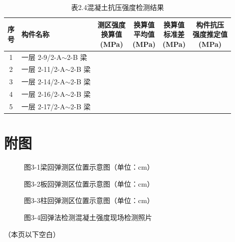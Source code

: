 \documentclass[UTF8, zihao=-4, a4paper]{ctexart}
\begin{document}
\begin{table}[h]\centering
\caption*{\songti 表2.4\quad 混凝土抗压强度检测结果}
\renewcommand{\arraystretch}{1.4}
\begin{tabular}{|c|l|c|c|c|c|}
\hline
\makecell{序\\号} & 构件名称 & \makecell{测区强度\\换算值\\(MPa)} & \makecell{换算值\\平均值\\(MPa)} & \makecell{换算值\\标准差\\(MPa)} & \makecell{构件抗压\\强度推定值\\(MPa)} \\\hline
1 & 一层 2-9/2-A$\sim$2-B 梁  & ~ & ~ & ~ & ~ \\\hline
2 & 一层 2-11/2-A$\sim$2-B 梁 & ~ & ~ & ~ & ~ \\\hline
3 & 一层 2-14/2-A$\sim$2-B 梁 & ~ & ~ & ~ & ~ \\\hline
4 & 一层 2-16/2-A$\sim$2-B 梁 & ~ & ~ & ~ & ~ \\\hline
5 & 一层 2-17/2-A$\sim$2-B 梁 & ~ & ~ & ~ & ~ \\\hline
\end{tabular}
\end{table}

\section{附图}

\begin{figure}[h]\centering
\caption*{\songti 图3-1\quad 梁回弹测区位置示意图（单位：cm）}
\end{figure}

\begin{figure}[h]\centering
{}
\caption*{\songti 图3-2\quad 板回弹测区位置示意图（单位：cm）}
\end{figure}

\begin{figure}[h]\centering
{}
\caption*{\songti 图3-3\quad 柱回弹测区位置示意图（单位：cm）}
\end{figure}

\begin{figure}[h]\centering
{}
\caption*{\songti 图3-4\quad 回弹法检测混凝土强度现场检测照片}
\end{figure}

\begin{center}（本页以下空白）\end{center}
\end{document}
